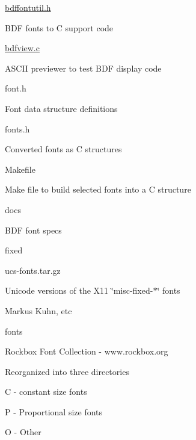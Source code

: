 \begin{DoxyItemize}
\begin{DoxyItemize}
\begin{DoxyItemize}
\item \hyperlink{bdffontutil_8h}{bdffontutil.\-h}
\begin{DoxyItemize}
\item B\-D\-F fonts to C support code
\end{DoxyItemize}
\item \hyperlink{bdfview_8c}{bdfview.\-c}
\begin{DoxyItemize}
\item A\-S\-C\-I\-I previewer to test B\-D\-F display code
\end{DoxyItemize}
\item font.\-h
\begin{DoxyItemize}
\item Font data structure definitions
\end{DoxyItemize}
\item fonts.\-h
\begin{DoxyItemize}
\item Converted fonts as C structures
\end{DoxyItemize}
\item Makefile
\begin{DoxyItemize}
\item Make file to build selected fonts into a C structure
\end{DoxyItemize}
\item docs
\begin{DoxyItemize}
\item B\-D\-F font specs
\end{DoxyItemize}
\item fixed
\begin{DoxyItemize}
\item ucs-\/fonts.\-tar.\-gz
\item Unicode versions of the X11 \char`\"{}misc-\/fixed-\/$\ast$\char`\"{} fonts
\item Markus Kuhn, etc
\end{DoxyItemize}
\item fonts
\begin{DoxyItemize}
\item Rockbox Font Collection -\/ www.\-rockbox.\-org
\item Reorganized into three directories
\begin{DoxyItemize}
\item C -\/ constant size fonts
\item P -\/ Proportional size fonts
\item O -\/ Other
\end{DoxyItemize}

\end{DoxyItemize}
\end{DoxyItemize}
\end{DoxyItemize}
\end{DoxyItemize}
